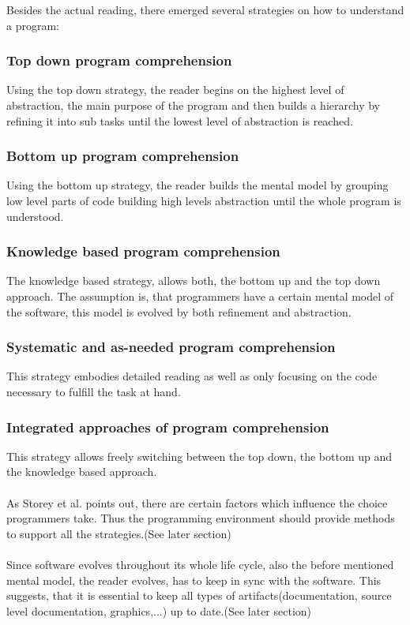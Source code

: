 Besides the actual reading, there emerged several strategies on how to understand a program\cite{Storey:1999:CDE:308936.308940}\cite{Storey:1997:PUT:832304.836998}:
\subsubsection*{Top down program comprehension}
Using the top down strategy, the reader begins on the highest level of abstraction, the main purpose of the program and then builds a hierarchy by refining it into sub tasks until the lowest level of abstraction is reached.
\subsubsection*{Bottom up program comprehension} Using the bottom up strategy, the reader builds the mental model by grouping low level parts of code building high levels abstraction until the whole program is understood.
\subsubsection*{Knowledge based program comprehension} The knowledge based strategy, allows both, the bottom up and the top down approach. The assumption is, that programmers have a certain mental model of the software, this model is evolved by both refinement and abstraction.
\subsubsection*{Systematic and as-needed program comprehension} This strategy embodies detailed reading as well as only focusing on the code necessary to fulfill the task at hand.
\subsubsection*{Integrated approaches of program comprehension} This strategy allows freely switching between the top down, the bottom up and the knowledge based approach.
\\\\
As Storey et al.\cite{Storey:1999:CDE:308936.308940} points out, there are certain factors which influence the choice programmers take. Thus the programming environment should provide methods to support all the strategies.(See later section)
\\\\
Since software evolves throughout its whole life cycle, also the before mentioned mental model, the reader evolves, has to keep in sync with the software. This suggests, that it is essential to keep all types of artifacts(documentation, source level documentation, graphics,...) up to date.(See later section)

